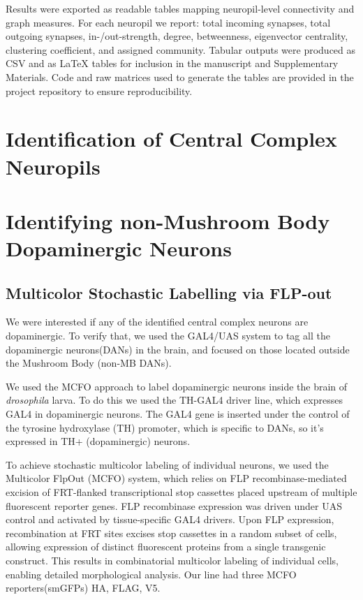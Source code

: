     Results were exported as readable tables mapping neuropil-level connectivity and graph measures. For each neuropil we report: total incoming synapses, total outgoing synapses, in-/out-strength, degree, betweenness, eigenvector centrality, clustering coefficient, and assigned community. Tabular outputs were produced as CSV and as LaTeX tables for inclusion in the manuscript and Supplementary Materials. Code and raw matrices used to generate the tables are provided in the project repository to ensure reproducibility.



\section{Identification of Central Complex Neuropils}

\section{Identifying non-Mushroom Body Dopaminergic Neurons}
    \subsection{Multicolor Stochastic Labelling via FLP-out} 
    We were interested if any of the identified central complex neurons are dopaminergic. To verify that, we used the GAL4/UAS system to tag all the dopaminergic neurons(DANs) in the brain, and focused on those located outside the Mushroom Body (non-MB DANs).

    We used the MCFO approach to label dopaminergic neurons inside the brain of \textit{drosophila} larva. To do this we used the TH-GAL4 driver line, which expresses GAL4 in dopaminergic neurons. The GAL4 gene is inserted under the control of the tyrosine hydroxylase (TH) promoter, which is specific to DANs, so it’s expressed in TH+ (dopaminergic) neurons.


    To achieve stochastic multicolor labeling of individual neurons, we used the Multicolor Flp\-Out (MCFO) system, which relies on FLP recombinase-mediated excision of FRT-flanked transcriptional stop cassettes placed upstream of multiple fluorescent reporter genes. FLP recombinase expression was driven under UAS control and activated by tissue-specific GAL4 drivers. Upon FLP expression, recombination at FRT sites excises stop cassettes in a random subset of cells, allowing expression of distinct fluorescent proteins from a single transgenic construct. This results in combinatorial multicolor labeling of individual cells, enabling detailed morphological analysis.
    Our line had three MCFO reporters(smGFPs) \- HA, FLAG, V5.

